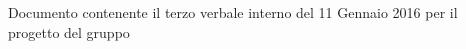 Documento contenente il terzo verbale interno del 11 Gennaio 2016 per il progetto \progetto del gruppo \gruppo